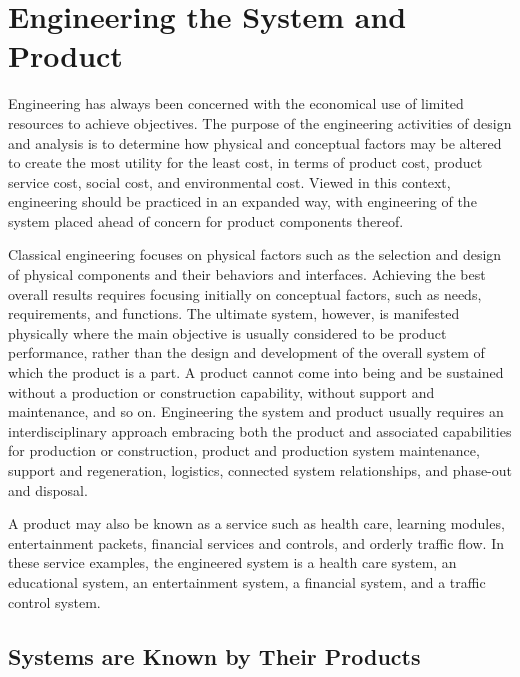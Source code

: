 
\section{Engineering the System and Product}

Engineering has always been concerned with the economical use of limited resources to achieve objectives. The purpose of the engineering activities of design and analysis is to determine how physical and conceptual factors may be altered to create the most utility for the least cost, in terms of product cost, product service cost, social cost, and environmental cost. Viewed in this context, engineering should be practiced in an expanded way, with engineering of the system placed ahead of concern for product components thereof.

Classical engineering focuses on physical factors such as the selection and design of physical components and their behaviors and interfaces. Achieving the best overall results requires focusing initially on conceptual factors, such as needs, requirements, and functions. The ultimate system, however, is manifested physically where the main objective is usually considered to be product performance, rather than the design and development of the overall system of which the product is a part. A product cannot come into being and be sustained without a production or construction capability, without support and maintenance, and so on. Engineering the system and product usually requires an interdisciplinary approach embracing both the product and associated capabilities for production or construction, product and production system maintenance, support and regeneration, logistics, connected system relationships, and phase-out and disposal.

A product may also be known as a service such as health care, learning modules, entertainment packets, financial services and controls, and orderly traffic flow. In these service examples, the engineered system is a health care system, an educational system, an entertainment system, a financial system, and a traffic control system.

\subsection{Systems are Known by Their Products}

